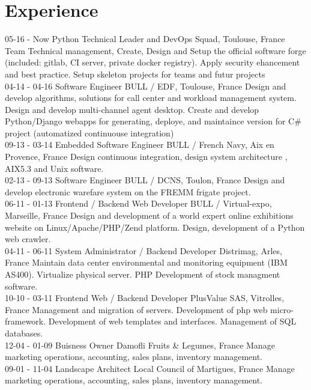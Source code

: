 \documentclass[]{friggeri-cv}
\begin{document}
\section{Experience}
\begin{entrylist}
  \entry
    {05-16 - Now}
    {Python Technical Leader and DevOps}
    {Squad, Toulouse, France}
    {Team Technical management, Create, Design and Setup the official software forge (included: gitlab, CI server, private docker registry). Apply security ehancement and best practice. Setup skeleton projects for teams and futur projects\\}
  \entry
    {04-14 - 04-16}
    {Software Engineer}
    {BULL / EDF, Toulouse, France}
    {Design and develop algorithms, solutions for call center and workload management system. Design and develop multi-channel agent desktop.
    Create and develop Python/Django webapps for generating, deploye, and maintaince version for C\# project (automatized continuouse integration)\\}
  \entry
    {09-13 - 03-14}
    {Embedded Software Engineer}
    {BULL / French Navy, Aix en Provence, France}
    {Design continuous integration, design system architecture , AIX5.3 and Unix software.\\}
    \entry
    {02-13 - 09-13}
    {Software Engineer}
    {BULL / DCNS, Toulon, France}
    {Design and develop electronic warefare system on the FREMM frigate project.\\}
    \entry
    {06-11 - 01-13}
    {Frontend / Backend Web Developer}
    {BULL / Virtual-expo, Marseille, France}
    {Design and development of a world expert online exhibitions website on Linux/Apache/PHP/Zend platform. Design, development of a Python web crawler.\\}
    \entry
    {04-11 - 06-11}
    {System Administrator / Backend Developer}
    {Distrimag, Arles, France}
    {Maintain data center environmental and monitoring equipment (IBM AS400). Virtualize physical server. PHP Development of stock managment software.\\}
    \entry
    {10-10 - 03-11}
    {Frontend Web / Backend Developer}
    {PlusValue SAS, Vitrolles, France}
    {Management and migration of servers. Development of php web micro-framework. Development of web templates and interfaces. Management of SQL databases.\\}
    \entry
    {12-04 - 01-09}
    {Buisness Owner}
    {Damofli Fruits \& Legumes, France}
    {Manage marketing operations, accounting, sales plans, inventory management.\\}
    \entry
    {09-01 - 11-04}
    {Landscape Architect}
    {Local Council of Martigues, France}
    {Manage marketing operations, accounting, sales plans, inventory management.}
\end{entrylist}
\end{document}

